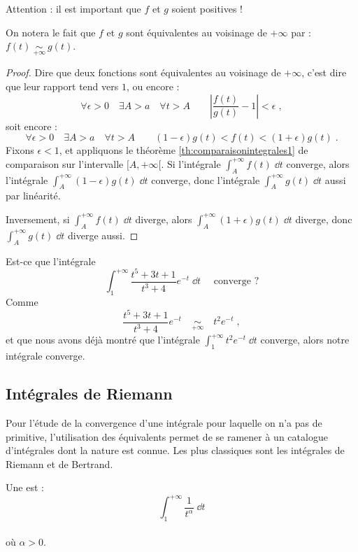 \documentclass[class=report,crop=false]{standalone}
\begin{document}
Attention : il est important que $f$ et $g$ soient positives !

On notera le fait que $f$ et $g$ sont équivalentes au voisinage de $+\infty$ par : 
$\displaystyle f(t) \ \underset{+\infty}{\sim}\ g(t)$.
 
\begin{proof}
Dire que deux fonctions sont équivalentes au voisinage de $+\infty$,
c'est dire que leur rapport tend vers $1$, ou encore :
$$\forall \epsilon>0\quad \exists A>a\quad \forall t>A \qquad
\left|\frac{f(t)}{g(t)}-1\right|<\epsilon\;,$$
soit encore :
$$\forall \epsilon>0 \quad \exists A>a \quad \forall t>A \qquad (1-\epsilon)g(t)<f(t)<(1+\epsilon)g(t)\;.$$
Fixons $\epsilon<1$, et appliquons le théorème \ref{th:comparaisonintegrales1} de comparaison
sur l'intervalle $[A,+\infty[$. Si l'intégrale $\int_A^{+\infty}
  f(t)\;\dd t$ converge, alors l'intégrale 
$\int_A^{+\infty} (1-\epsilon)g(t)\;\dd t$ converge, donc l'intégrale
  $\int_A^{+\infty} g(t)\;\dd t$ aussi par linéarité. 

Inversement, si $\int_A^{+\infty} f(t)\;\dd t$ diverge, alors $\int_A^{+\infty}
  (1+\epsilon) g(t)\;\dd t$ diverge, donc 
$\int_A^{+\infty} g(t)\;\dd t$ diverge aussi. 
\end{proof}

\begin{exemple}
Est-ce que l'intégrale 
$$\int_1^{+\infty} \frac{t^5+3t+1}{t^3+4}e^{-t}\;\dd t\quad\text{ converge ?}$$
Comme 
$$\frac{t^5+3t+1}{t^3+4}e^{-t} \quad\underset{+\infty}{\sim}\quad t^2e^{-t}\;,
$$
et que nous avons déjà montré que l'intégrale 
$\int_1^{+\infty} t^2e^{-t}\;\dd t$ converge, alors
notre intégrale converge.
\end{exemple}




\subsection{Intégrales de Riemann}

Pour l'étude de la convergence d'une intégrale pour laquelle on n'a pas de primitive, 
l'utilisation des équivalents permet de se ramener 
à un catalogue d'intégrales dont la nature est connue. Les
plus classiques sont les intégrales de Riemann et de Bertrand.


Une  est :
$$\int_1^{+\infty} \frac{1}{t^{\alpha}}\;\dd t$$\\
où $\alpha>0$.
\end{document}
